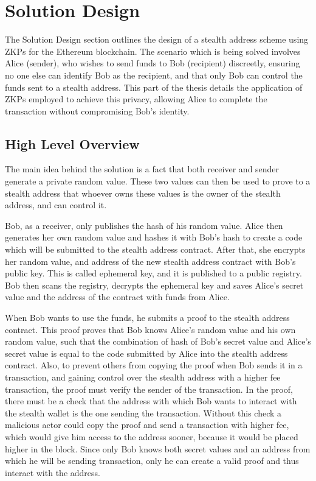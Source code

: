 \chapter{Solution Design}

The Solution Design section outlines the design of a stealth address
scheme using ZKPs for the Ethereum blockchain. The scenario which is being
solved involves Alice (sender), who wishes to send funds to Bob (recipient)
discreetly, ensuring no one else can identify Bob as the recipient, and that
only Bob can control the funds sent to a stealth address. This part of the
thesis details the application of ZKPs employed to achieve this privacy,
allowing Alice to complete the transaction without compromising Bob's identity.

\section{High Level Overview}

The main idea behind the solution is a fact that both
receiver and sender generate a private random value. These two values can then
be used to prove to a stealth address that whoever owns these values
is the owner of the stealth address, and can control it.

Bob, as a receiver, only publishes the hash of his random value. Alice then
generates her own random value and hashes it with Bob's hash to create a
code which will be submitted to the stealth address contract. After that, she
encrypts her random value, and address of the new stealth address
contract with Bob's public key. This is called ephemeral key, and it is published
to a public registry. Bob then scans the registry, decrypts the ephemeral key and
saves Alice's secret value and the address of the contract with funds from Alice.

When Bob wants to use the funds, he submits a proof to the stealth address
contract. This proof proves that Bob knows Alice's random value and his own
random value, such that the combination of hash of Bob's secret value and
Alice's secret value is equal to the code submitted by Alice into the stealth
address contract. Also, to prevent others from copying the proof when Bob
sends it in a transaction, and gaining control over the stealth address with a higher fee
transaction, the proof must verify the sender of the transaction. In the
proof, there must be a check that the address with which Bob wants to interact
with the stealth wallet is the one sending the transaction. Without this check
a malicious actor could copy the proof and send a transaction with higher fee,
which would give him access to the address sooner, because it would be placed
higher in the block. Since only Bob knows both secret values and an address
from which he will be sending transaction, only he can create a valid
proof and thus interact with the address.

